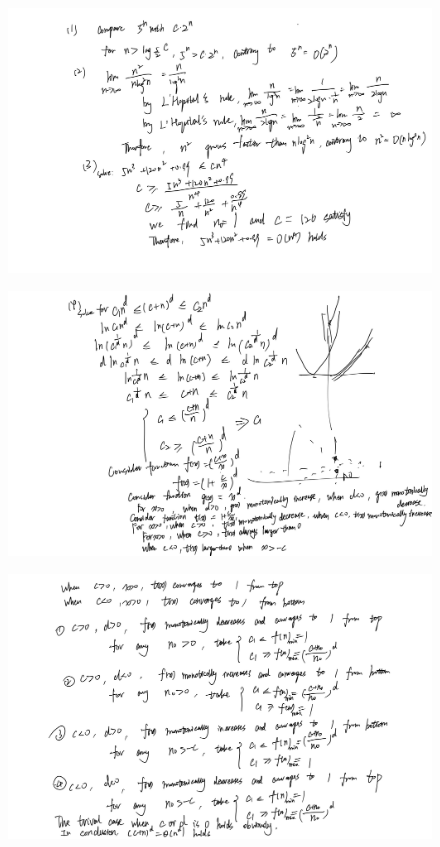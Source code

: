 \documentclass[10pt]{article}
\begin{document}
\begin{figure}[H]
  \centering
  \includegraphics[width=\linewidth]{../assets/3_1.jpg}
\end{figure}

\begin{figure}[H]
  \centering
  \includegraphics[width=\linewidth]{../assets/3_2.jpg}
\end{figure}

\begin{figure}[H]
  \centering
  \includegraphics[width=\linewidth]{../assets/3_3.jpg}
\end{figure}
\end{document}
